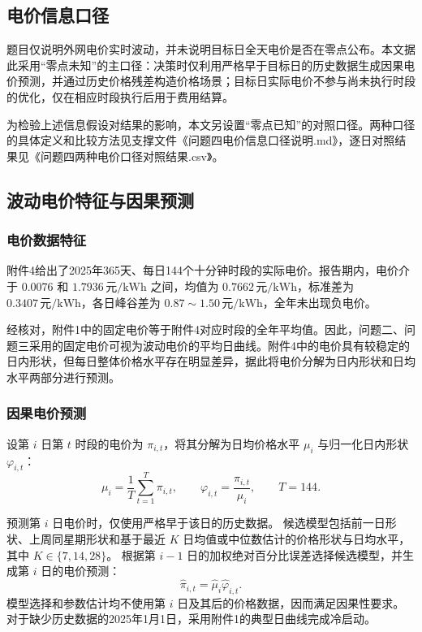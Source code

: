 \subsection{电价信息口径}

题目仅说明外网电价实时波动，并未说明目标日全天电价是否在零点公布。本文据此采用“零点未知”的主口径：决策时仅利用严格早于目标日的历史数据生成因果电价预测，并通过历史价格残差构造价格场景；目标日实际电价不参与尚未执行时段的优化，仅在相应时段执行后用于费用结算。

为检验上述信息假设对结果的影响，本文另设置“零点已知”的对照口径。两种口径的具体定义和比较方法见支撑文件《问题四电价信息口径说明.md》，逐日对照结果见《问题四两种电价口径对照结果.csv》。

\subsection{波动电价特征与因果预测}

\subsubsection{电价数据特征}

附件4给出了2025年365天、每日144个十分钟时段的实际电价。报告期内，电价介于 \(0.0076\) 和 \(1.7936\,\mathrm{元/kWh}\) 之间，均值为 \(0.7662\,\mathrm{元/kWh}\)，标准差为 \(0.3407\,\mathrm{元/kWh}\)，各日峰谷差为 \(0.87\sim1.50\,\mathrm{元/kWh}\)，全年未出现负电价。

经核对，附件1中的固定电价等于附件4对应时段的全年平均值。因此，问题二、问题三采用的固定电价可视为波动电价的平均日曲线。附件4中的电价具有较稳定的日内形状，但每日整体价格水平存在明显差异，据此将电价分解为日内形状和日均水平两部分进行预测。

\subsubsection{因果电价预测}

设第 \(i\) 日第 \(t\) 时段的电价为 \(\pi_{i,t}\)，将其分解为日均价格水平 \(\mu_i\) 与归一化日内形状 \(\varphi_{i,t}\)：
\begin{equation}
\mu_i=\frac{1}{T}\sum_{t=1}^{T}\pi_{i,t},
\qquad
\varphi_{i,t}=\frac{\pi_{i,t}}{\mu_i},
\qquad T=144.
\label{eq:q4_price_decomposition}
\end{equation}

预测第 \(i\) 日电价时，仅使用严格早于该日的历史数据。
候选模型包括前一日形状、上周同星期形状和基于最近 \(K\) 日均值或中位数估计的价格形状与日均水平，其中 \(K\in\{7,14,28\}\)。
根据第 \(i-1\) 日的加权绝对百分比误差选择候选模型，并生成第 \(i\) 日的电价预测：
\begin{equation}
\widehat{\pi}_{i,t}
=
\widehat{\mu}_i\widehat{\varphi}_{i,t}.
\label{eq:q4_price_forecast}
\end{equation}
模型选择和参数估计均不使用第 \(i\) 日及其后的价格数据，因而满足因果性要求。对于缺少历史数据的2025年1月1日，采用附件1的典型日曲线完成冷启动。

